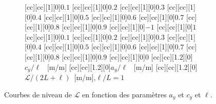 \begin{figure}[h!]
\begin{subfigure}[h]{0.8\textwidth}
[cc][cc][1][0]{$0.1$}
[cc][cc][1][0]{$0.2$}
[cc][cc][1][0]{$0.3$}
[cc][cc][1][0]{$0.4$}
[cc][cc][1][0]{$0.5$}
[cc][cc][1][0]{$0.6$}
[cc][cc][1][0]{$0.7$}
[cc][cc][1][0]{$0.8$}
[cc][cc][1][0]{$0.9$}
[cc][cc][1][0]{$-1$}
[cc][cc][1][0]{$1$}
[cc][cc][1][0]{$0.1$}
[cc][cc][1][0]{$0.2$}
[cc][cc][1][0]{$0.3$}
[cc][cc][1][0]{$0.4$}
[cc][cc][1][0]{$0.5$}
[cc][cc][1][0]{$0.6$}
[cc][cc][1][0]{$0.7$}
[cc][cc][1][0]{$0.8$}
[cc][cc][1][0]{$0.9$}
[cc][cc][1][0]{$0$}
[cc][cc][1.2][0]{$c_y/\ell$ \ [m/m]}
[cc][cc][1.2][0]{$a_y/\ell$ \ [m/m]}
[cc][cc][1.2][0]{$\mathcal{L}/(2L+\ell)$\ [m/m],\quad $\ell/L =1$}
\caption{}
\end{subfigure}
\caption[Variation de $\mathcal{L}$ en fonction de $a_y$ et $c_y$]{\label{chap1:fig:stat_max} Courbes de niveau de $\mathcal{L}$ en fonction des paramètres $a_y$ et $c_y$ et $\ell$.}
\end{figure}
